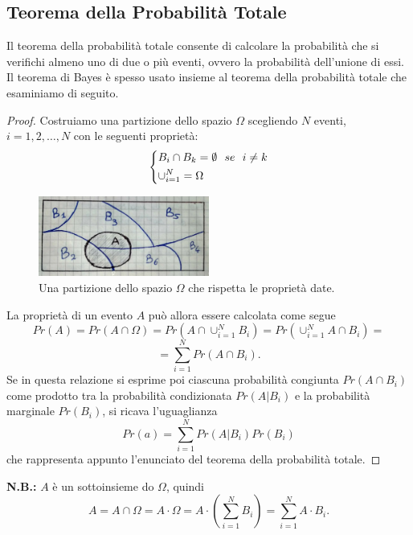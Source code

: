\documentclass[12pt,oneside,openany]{memoir}
\numberwithin{equation}{subsection}
\begin{document}
\subsection{Teorema della Probabilit\`a Totale}
Il teorema della probabilit\`a totale consente di calcolare la probabilit\`a che
si verifichi almeno uno di due o pi\`u eventi, ovvero la probabilit\`a
dell'unione di essi.
\bigbreak
Il teorema di Bayes \`e spesso usato insieme al teorema della probabilit\`a
totale che esaminiamo di seguito.
\begin{proof}
Costruiamo una partizione dello spazio $\Omega$ scegliendo $N$ eventi,
$i = 1, 2, \dots, N$ con le seguenti propriet\`a:
\[
    \begin{dcases}
        B_i \cap B_k = \emptyset \ \ se \ \ i \neq k\\
        \cup_{i = 1}^{N} = \Omega
    \end{dcases}
\]
\begin{figure}[H]
    \centering
    \captionsetup{justification=centering}
    \includegraphics[width=0.5\textwidth]{images/set_partition.jpg}
    \caption{Una partizione dello spazio $\Omega$ che rispetta le propriet\`a
    date.}
\end{figure}
La propriet\`a di un evento $A$ pu\`o allora essere calcolata come segue
\[
    Pr(A) = Pr(A \cap \Omega) = Pr(A \cap \cup_{i = 1}^{N} B_i) =
    Pr(\cup_{i = 1}^{N} A \cap B_i) =
\]
\[
    = \sum_{i = 1}^{N} Pr(A \cap B_i).
\]
Se in questa relazione si esprime poi ciascuna probabilit\`a congiunta
$Pr(A \cap B_i)$ come prodotto tra la probabilit\`a condizionata $Pr(A | B_i)$ e
la probabilit\`a marginale $Pr(B_i)$, si ricava l'uguaglianza
\[
    Pr(a) = \sum_{i = 1}^{N} Pr(A|B_i) Pr(B_i)
\]
che rappresenta appunto l'enunciato del teorema della probabilit\`a totale.
\end{proof}
\bigbreak\noindent
\textbf{N.B.:} $A$ \`e un sottoinsieme do $\Omega$, quindi
\[
    A = A \cap \Omega = A \cdot \Omega = A \cdot \left(\sum_{i = 1}^{N} B_i
    \right) = \sum_{i = 1}^{N} A \cdot B_i.
\]

\end{document}

